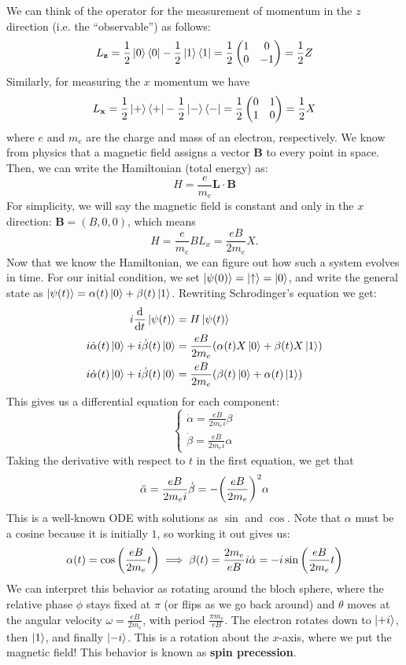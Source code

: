 We can think of the operator for the measurement of momentum in the $z$ direction (i.e. the ``observable'') as follows:
\[ L_{\mathbf{z}} = \frac{1}{2} \ket{0} \bra{0} - \frac{1}{2} \ket{1} \bra{1} = \frac{1}{2} \begin{pmatrix}
    1 & 0 \\ 0 & -1
 \end{pmatrix} = \frac{1}{2} Z \]
Similarly, for measuring the $x$ momentum we have
\[ L_{\mathbf{x}} = \frac{1}{2} \ket{+} \bra{+} - \frac{1}{2} \ket{-} \bra{-} = \frac{1}{2} \begin{pmatrix}
    0 & 1 \\ 1 & 0
 \end{pmatrix} = \frac{1}{2} X \]
where $e$ and $m_e$ are the charge and mass of an electron, respectively. We know from physics that a magnetic field assigns a vector $\mathbf{B}$ to every point in space. Then, we can write the Hamiltonian (total energy) as:
\[ H = \frac{e}{m_e} \mathbf{L} \cdot \mathbf{B} \]
For simplicity, we will say the magnetic field is constant and only in the $x$ direction: $\mathbf{B} = (B, 0, 0)$,
which means 
\[H = \frac{e}{m_e} BL_x = \frac{eB}{2m_e} X.\] 
Now that we know the Hamiltonian, we can figure out how such a system evolves in time. For our
initial condition, we set $\ket{\psi(0)} = \ket{\uparrow} = \ket{0}$, and write the general state as $\ket{\psi(t)} = \alpha(t) \ket{0} + \beta(t) \ket{1}$.
Rewriting Schrodinger's equation we get:
\begin{align*}
    i \dv{}{t} \ket{\psi(t)} &= H \ket{\psi(t)} \\
    i \dot{\alpha}(t) \ket{0} + i \dot{\beta}(t) \ket{0} &= \frac{eB}{2m_e} \qty(\alpha(t) X \ket{0} + \beta(t) X \ket{1}) \\
    i \dot{\alpha}(t) \ket{0} + i \dot{\beta}(t) \ket{0} &= \frac{eB}{2m_e} \qty(\beta(t) \ket{0} + \alpha(t) \ket{1})
\end{align*}
This gives us a differential equation for each component:
\[ \begin{cases} \dot{\alpha} = \frac{eB}{2m_e i} \beta \\ \dot{\beta} = \frac{eB}{2m_e i} \alpha \end{cases} \]
Taking the derivative with respect to $t$ in the first equation, we get that
\begin{align*}
    \ddot{\alpha} = \frac{eB}{2m_e i} \dot{\beta} = - \qty(\frac{eB}{2m_e})^2 \alpha
\end{align*}
This is a well-known ODE with solutions as $\sin$ and $\cos$. Note that $\alpha$ must be a cosine because it is initially $1$, so working it out gives us:
\[ \alpha(t) = \cos\qty(\frac{eB}{2m_e} t) \implies \beta(t) = \frac{2m_e}{eB} i \dot{\alpha} = - i \sin\qty(\frac{eB}{2m_e} t) \]
We can interpret this behavior as rotating around the bloch sphere, where the relative phase $\phi$ stays fixed at $\pi$ (or flips as we go back around) and $\theta$ moves at the angular velocity 
$\omega = \frac{eB}{2m_e}$, with period $\frac{\pi m_e}{eB}$.
The electron rotates down to $\ket{+i}$, then $\ket{1}$, and finally $\ket{-i}$. This is a rotation about the $x$-axis, where we put the magnetic field! This behavior is known as \textbf{spin precession}.

